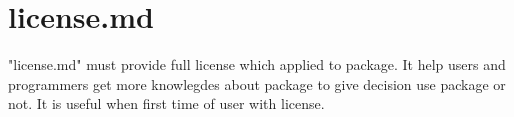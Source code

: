 \section{license.md}

\begin{crules}
\end{crules}

"license.md" must provide full license which applied to package. It help
users and programmers get more knowlegdes about package to give
decision use package or not. It is useful when first time of user with
license.
